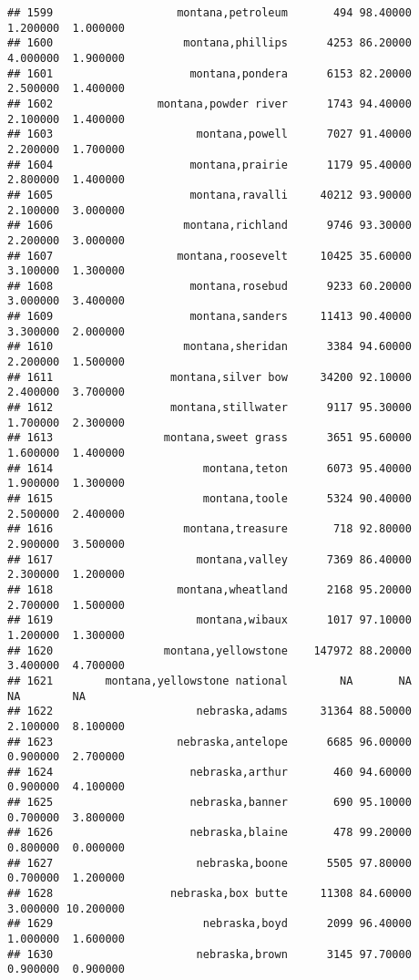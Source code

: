\documentclass[
]{article}
\begin{document}
\begin{verbatim}
## 1599                   montana,petroleum       494 98.40000  1.200000  1.000000
## 1600                    montana,phillips      4253 86.20000  4.000000  1.900000
## 1601                     montana,pondera      6153 82.20000  2.500000  1.400000
## 1602                montana,powder river      1743 94.40000  2.100000  1.400000
## 1603                      montana,powell      7027 91.40000  2.200000  1.700000
## 1604                     montana,prairie      1179 95.40000  2.800000  1.400000
## 1605                     montana,ravalli     40212 93.90000  2.100000  3.000000
## 1606                    montana,richland      9746 93.30000  2.200000  3.000000
## 1607                   montana,roosevelt     10425 35.60000  3.100000  1.300000
## 1608                     montana,rosebud      9233 60.20000  3.000000  3.400000
## 1609                     montana,sanders     11413 90.40000  3.300000  2.000000
## 1610                    montana,sheridan      3384 94.60000  2.200000  1.500000
## 1611                  montana,silver bow     34200 92.10000  2.400000  3.700000
## 1612                  montana,stillwater      9117 95.30000  1.700000  2.300000
## 1613                 montana,sweet grass      3651 95.60000  1.600000  1.400000
## 1614                       montana,teton      6073 95.40000  1.900000  1.300000
## 1615                       montana,toole      5324 90.40000  2.500000  2.400000
## 1616                    montana,treasure       718 92.80000  2.900000  3.500000
## 1617                      montana,valley      7369 86.40000  2.300000  1.200000
## 1618                   montana,wheatland      2168 95.20000  2.700000  1.500000
## 1619                      montana,wibaux      1017 97.10000  1.200000  1.300000
## 1620                 montana,yellowstone    147972 88.20000  3.400000  4.700000
## 1621        montana,yellowstone national        NA       NA        NA        NA
## 1622                      nebraska,adams     31364 88.50000  2.100000  8.100000
## 1623                   nebraska,antelope      6685 96.00000  0.900000  2.700000
## 1624                     nebraska,arthur       460 94.60000  0.900000  4.100000
## 1625                     nebraska,banner       690 95.10000  0.700000  3.800000
## 1626                     nebraska,blaine       478 99.20000  0.800000  0.000000
## 1627                      nebraska,boone      5505 97.80000  0.700000  1.200000
## 1628                  nebraska,box butte     11308 84.60000  3.000000 10.200000
## 1629                       nebraska,boyd      2099 96.40000  1.000000  1.600000
## 1630                      nebraska,brown      3145 97.70000  0.900000  0.900000

\end{verbatim}
\end{document}
